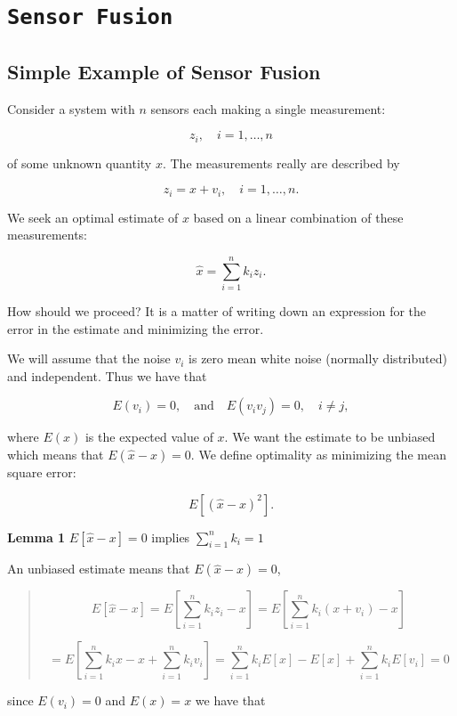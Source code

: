 \hypertarget{sensor-fusion}{%
\section{\texorpdfstring{\texttt{Sensor\ Fusion}}{Sensor Fusion}}\label{sensor-fusion}}

\hypertarget{simple-example-of-sensor-fusion}{%
\subsection{Simple Example of Sensor
Fusion}\label{simple-example-of-sensor-fusion}}

Consider a system with \(n\) sensors each making a single measurement:

\[z_i, \quad i=1, \dots, n\]

of some unknown quantity \(x\). The measurements really are described by

\[z_i = x + v_i,  \quad i=1, \dots, n .\]

We seek an optimal estimate of \(x\) based on a linear combination of
these measurements:

\[\hat{x} = \sum_{i=1}^n k_i z_i .\]

How should we proceed? It is a matter of writing down an expression for
the error in the estimate and minimizing the error.

We will assume that the noise \(v_i\) is zero mean white noise (normally
distributed) and independent. Thus we have that

\[E(v_i) =0, \quad \mbox{and} \quad E(v_i v_j) = 0, \quad i\neq j,\]

where \(E(x)\) is the expected value of \(x\). We want the estimate to
be unbiased which means that \(E(\hat{x}-x) = 0\). We define optimality
as minimizing the mean square error:

\[E[(\hat{x}-x)^2].\]

\textbf{Lemma 1} \(E[\hat{x}-x]=0\) implies \(\sum_{i=1}^n k_i = 1\)

An unbiased estimate means that \(E(\hat{x}-x) = 0\),

\begin{quote}
\[E[\hat{x}-x] = E\left[\sum_{i=1}^n k_i z_i - x\right] = E\left[\sum_{i=1}^n k_i (x+v_i) - x\right]\]

\[= E\left[\sum_{i=1}^n k_i x - x + \sum_{i=1}^n k_i v_i\right]
= \sum_{i=1}^n k_i E[x] - E[x]  + \sum_{i=1}^n k_i E[v_i] = 0\]
\end{quote}

since \(E(v_i)=0\) and \(E(x)=x\) we have that

